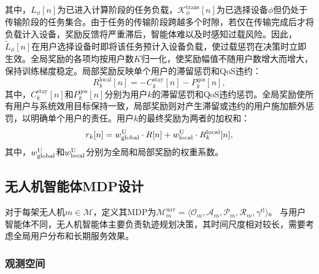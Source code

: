 其中，$L_\phi[n]$为已进入计算阶段的任务负载，$\mathcal{K}_\phi^{\text{trans}}[n]$为已选择设备$\phi$但仍处于传输阶段的任务集合。由于任务的传输阶段跨越多个时隙，若仅在传输完成后才将负载计入设备，奖励反馈将严重滞后，智能体难以及时感知过载风险。因此，$\tilde{L}_\phi[n]$在用户选择设备时即将该任务预计入设备负载，使过载惩罚在决策时立即生效。全局奖励的各项均按用户数$K$归一化，使奖励幅值不随用户数增大而增大，保持训练梯度稳定。局部奖励反映单个用户的滞留惩罚和QoS违约：
\begin{equation}
R_k^{\text{local}}[n] = -C_k^{\text{stay}}[n] - P_k^{\text{qos}}[n],
\end{equation}
其中，$C_k^{\text{stay}}[n]$和$P_k^{\text{qos}}[n]$分别为用户$k$的滞留惩罚和QoS违约惩罚。全局奖励使所有用户与系统效用目标保持一致，局部奖励则对产生滞留或违约的用户施加额外惩罚，以明确单个用户的责任。用户$k$的最终奖励为两者的加权和：
\begin{equation}
r_k[n] = w_{\text{global}}^{\rm U} \cdot R[n] + w_{\text{local}}^{\rm U} \cdot R_k^{\text{local}}[n],
\end{equation}
其中，$w_{\text{global}}^{\rm U}$和$w_{\text{local}}^{\rm U}$分别为全局和局部奖励的权重系数。

\subsection{无人机智能体MDP设计}
对于每架无人机$m \in \mathcal{M}$，定义其MDP为$\mathcal{M}_m^{\text{uav}} = \langle \mathcal{O}_m, \mathcal{A}_m, \mathcal{P}_m, \mathcal{R}_m, \gamma^{\text{rl}} \rangle$。
与用户智能体不同，无人机智能体主要负责轨迹规划决策，其时间尺度相对较长，需要考虑全局用户分布和长期服务效果。

\subsubsection{观测空间}

